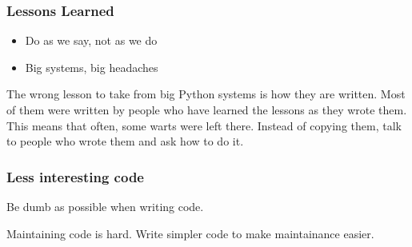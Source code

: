 \begin{frame}[fragile]
\frametitle{Lessons Learned}

\begin{itemize}
\item Do as we say, not as we do
\item Big systems, big headaches
\end{itemize}

\end{frame}

The wrong lesson to take from big Python systems is how they are written.
Most of them were written by people who have learned the lessons
as they wrote them.
This means that often,
some warts were left there.
Instead of copying them,
talk to people who wrote them and ask how to do it.

\begin{frame}[fragile]
\frametitle{Less interesting code}

Be dumb as possible when writing code.

\end{frame}

Maintaining code is hard.
Write simpler code to make maintainance easier.


